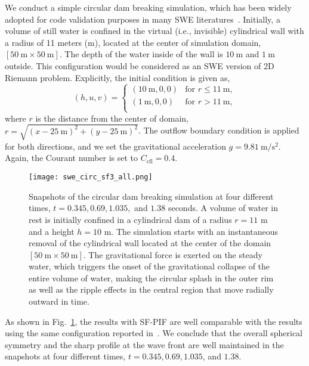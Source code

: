 \documentclass[times,preprint,3p]{elsarticle}
\begin{document}
We conduct a simple circular dam breaking simulation,
which has been widely adopted for code validation purposes
in many SWE
literatures~\cite{alcrudo1993high,toro2001shock,delis2005numerical}.
Initially, a volume of still water is confined
in the virtual (i.e., invisible) cylindrical
wall with a radius of 11 meters (m), %
located at the center of simulation domain,
\( \left[ \SI{50}{\meter} \times \SI{50}{\meter} \right] \).
The depth of the water inside of the wall is
\( \SI{10}{\meter} \) and \( \SI{1}{\meter} \) outside.
This configuration would be considered as an
SWE version of 2D Riemann problem.
Explicitly, the initial condition is given as,
\begin{equation}\label{eq:swe-init}
    \left(h, u, v \right) = \begin{cases}
        \left(\SI{10}{\meter}, 0, 0 \right) & \text{for } r \le \SI{11}{\meter}, \\
        \left(\SI{1}{\meter}, 0, 0 \right) & \text{for } r > \SI{11}{\meter}, \\
    \end{cases}
\end{equation}
where \( r \) is the distance from the center of domain,
\( r = \sqrt{\left( x - \SI{25}{\meter} \right)^{2} + \left( y - \SI{25}{\meter} \right)^{2} } \).
The outflow boundary condition is applied for both directions,
and we set the gravitational acceleration \( g = \SI{9.81}{\meter\per\square\second}\).
Again, the Courant number is set to \( C_{\text{cfl}} = 0.4 \).


%
\begin{figure}[ht!]
    \centering
    \texttt{[image: swe\_circ\_sf3\_all.png]}
    \caption{Snapshots of the circular dam breaking simulation
        at four different times, \( t = 0.345, 0.69, 1.035, \) and $1.38$ seconds.
        A volume of water in rest is initially confined
        in a cylindrical dam of a radius $r=11$ m and a height $h=10$ m.
        The simulation starts with an instantaneous removal of the cylindrical wall
        located at the center of the domain
        \( \left[ \SI{50}{\meter} \times \SI{50}{\meter} \right] \).
        The gravitational force is exerted on the steady water,
        which triggers the onset of the gravitational collapse of the entire volume of water,
        making the circular splash in the outer rim as well as the ripple effects
        in the central region that move radially outward in time.
    }\label{fig:swe_circ}
\end{figure}
%
%
As shown in Fig.~\ref{fig:swe_circ}, the results with SF-PIF are
well comparable with the results using the same configuration
reported in~\cite{alcrudo1993high,toro2001shock,delis2005numerical}.
We conclude that the overall spherical symmetry and the sharp profile
at the wave front are well maintained in the snapshots
at four different times, $t=0.345, 0.69, 1.035$, and $1.38$.
\end{document}

